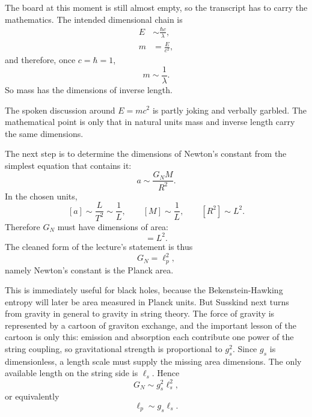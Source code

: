 The board at this moment is still almost empty, so the transcript has to carry the mathematics. The intended dimensional chain is
\begin{align}
E &\sim \frac{\hbar c}{\lambda}, \\
m &= \frac{E}{c^2},
\end{align}
and therefore, once \(c=\hbar=1\),
\begin{equation}
m \sim \frac{1}{\lambda}.
\end{equation}
So mass has the dimensions of inverse length.

\begin{remark}
The spoken discussion around \(E=mc^2\) is partly joking and verbally garbled. The mathematical point is only that in natural units mass and inverse length carry the same dimensions.
\end{remark}

The next step is to determine the dimensions of Newton's constant from the simplest equation that contains it:
\begin{equation}
a \sim \frac{G_N M}{R^2}.
\end{equation}
In the chosen units,
\[
[a] \sim \frac{L}{T^2} \sim \frac{1}{L}, \qquad [M] \sim \frac{1}{L}, \qquad [R^2]\sim L^2.
\]
Therefore \(G_N\) must have dimensions of area:
\begin{equation}
[G_N]=L^2.
\end{equation}
The cleaned form of the lecture's statement is thus
\begin{equation}
G_N=\ell_p^2,
\end{equation}
namely Newton's constant is the Planck area.

This is immediately useful for black holes, because the Bekenstein-Hawking entropy will later be area measured in Planck units. But Susskind next turns from gravity in general to gravity in string theory. The force of gravity is represented by a cartoon of graviton exchange, and the important lesson of the cartoon is only this: emission and absorption each contribute one power of the string coupling, so gravitational strength is proportional to \(g_s^2\). Since \(g_s\) is dimensionless, a length scale must supply the missing area dimensions. The only available length on the string side is \(\ell_s\). Hence
\begin{equation}
G_N \sim g_s^2 \ell_s^2,
\end{equation}
or equivalently
\begin{equation}
\ell_p \sim g_s \ell_s.
\end{equation}


